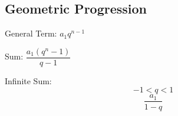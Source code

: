 \subsection{Geometric Progression}

General Term: $ a_{1} q^{n - 1} $

Sum: $ \dfrac{a_{1} (q^{n} - 1)}{q - 1} $

Infinite Sum:
$$ -1 < q < 1 $$
$$ \dfrac{a_{1}}{1 - q} $$